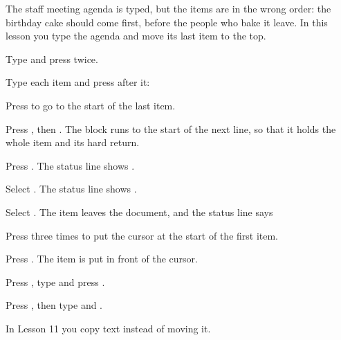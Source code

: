 The staff meeting agenda is typed, but the items are in the wrong order:
the birthday cake should come first, before the people who bake it leave.
In this lesson you type the agenda and move its last item to the top.

\begin{WPSteps}
\item Type  and press 
twice.
\item Type each item and press  after it:
\end{WPSteps}

\begin{WPSteps}
\item Press  to go to the start of the last item.
\item Press , then .  The block runs to the
start of the next line, so that it holds the whole item and its hard
return.
\end{WPSteps}

\begin{WPSteps}
\item Press .  The status line shows
.
\item Select .  The status line shows
.
\item Select .  The item leaves the document, and the status
line says 
\item Press  three times to put the cursor at the
start of the first item.
\end{WPSteps}
\begin{WPSteps}[resume]
\item Press .  The item is put in front of the cursor.
\end{WPSteps}

\begin{WPSteps}[resume]
\item Press , type  and press
.
\item Press , then type  and .
\end{WPSteps}
\EndReplay
In Lesson 11 you copy text instead of moving it.
